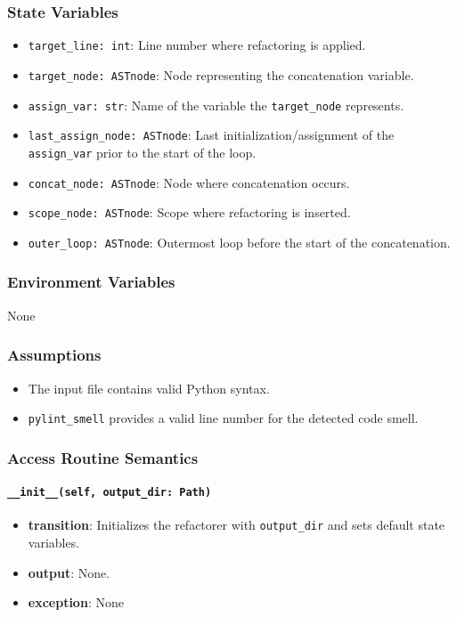 \documentclass[12pt, titlepage]{article}
\begin{document}
\subsubsection{State Variables}
\begin{itemize}
  \item \texttt{target\_line: int}: Line number where refactoring is applied.
  \item \texttt{target\_node: ASTnode}: Node representing the concatenation variable.
  \item \texttt{assign\_var: str}: Name of the variable the \texttt{target\_node} represents.
  \item \texttt{last\_assign\_node: ASTnode}: Last initialization/assignment of the \texttt{assign\_var} prior to the start of the loop.
  \item \texttt{concat\_node: ASTnode}: Node where concatenation occurs.
  \item \texttt{scope\_node: ASTnode}: Scope where refactoring is inserted.
  \item \texttt{outer\_loop: ASTnode}: Outermost loop before the start of the concatenation.
\end{itemize}
  
\subsubsection{Environment Variables}
None
  
\subsubsection{Assumptions}
\begin{itemize}
  \item The input file contains valid Python syntax.
  \item \texttt{pylint\_smell} provides a valid line number for the detected code smell.
\end{itemize}
  
\subsubsection{Access Routine Semantics}
  
\paragraph{\texttt{\_\_init\_\_(self, output\_dir: Path)}}
\begin{itemize}
  \item \textbf{transition}: Initializes the refactorer with \texttt{output\_dir} and sets default state variables.
  \item \textbf{output}: None.
  \item \textbf{exception}: None
\end{itemize}
  
\end{document}
